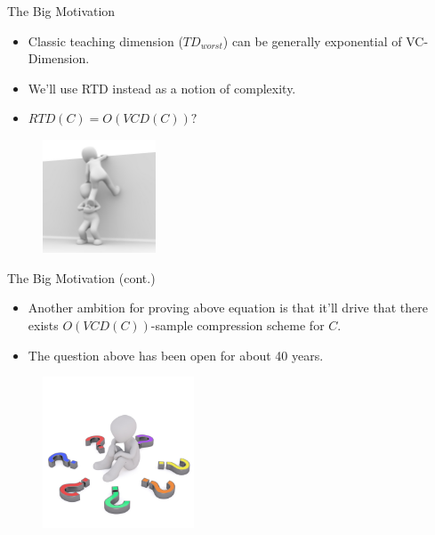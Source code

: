 \documentclass{beamer}
\begin{document}
\begin{frame}{The Big Motivation}
\begin{itemize}
    \item Classic teaching dimension ($TD_{worst}$) can be generally exponential of VC-Dimension.
    \item We'll use RTD instead as a notion of complexity. 
    \item $RTD(C) = O(VCD(C))?$
\end{itemize}

\begin{figure}[t]
\includegraphics[width=0.3\textwidth]{Figures/friends.jpg}
\end{figure}
    
\end{frame}


\begin{frame}{The Big Motivation (cont.)}
\begin{itemize}
    
    \item Another ambition for proving above equation is that it'll drive that there exists $O(VCD(C))$-sample compression scheme for $C$.
    \item The question above has been open for about 40 years.
\end{itemize}

\begin{figure}[t]
\centering
\includegraphics[width=0.4\textwidth]{Figures/question-mark.jpg}
\end{figure}
\end{frame}
\end{document}
